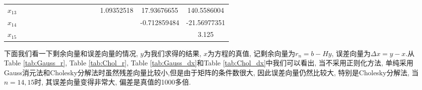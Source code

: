 \documentclass[a4paper]{article}
\begin{document}
\begin{CJK*}{GBK}{song}
\begin{center}
\begin{table*}[!htpb]
{\begin{threeparttable}[!htpb]
\begin{tabular}{ccccc ccccc ccccc}
$x_{13}$	&		&		&		&		&		&		&		&		&		&		&		&	1.09352518	&	17.93676655	&	140.5586004	\\
$x_{14}$	&		&		&		&		&		&		&		&		&		&		&		&		&	-0.712859484	&	-21.56977351	\\
$x_{15}$	&		&		&		&		&		&		&		&		&		&		&		&		&		&	3.125	\\
 \bottomrule
\end{tabular}
\end{threeparttable}}%
\end{table*}
\end{center}



下面我们看一下剩余向量和误差向量的情况, $y$为我们求得的结果, $x$为方程的真值, 记剩余向量为$r_n=b-Hy$, 误差向量为$\Delta x= y-x$.从Table \ref{tab:Gauss_r}, Table \ref{tab:Chol_r}, Table \ref{tab:Gauss_dx}和Table \ref{tab:Chol_dx}中我们可以看出, 当不采用正则化方法, 单纯采用Gauss消元法和Cholesky分解法时虽然残差向量比较小,但是由于矩阵的条件数很大, 因此误差向量仍然比较大, 特别是Cholesky分解法, 当$n=14,15$时, 其误差向量变得非常大, 偏差是真值的1000多倍.
\begin{center}
\begin{table*}[!htpb]
\end{table*}
\end{center}
\end{CJK*}
\end{document}
